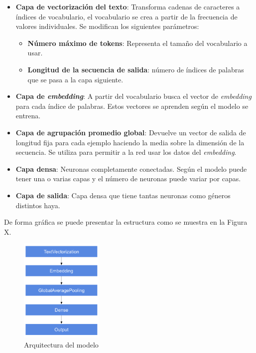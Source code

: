 \documentclass[12pt,a4paper, xcolor=table]{article}
\begin{document}
\begin{itemize}
\item \textbf{Capa de vectorización del texto}: Transforma cadenas de caracteres a índices de vocabulario, el vocabulario se crea a partir de la frecuencia de valores individuales. Se modifican los siguientes parámetros:
\begin{itemize}
\item \textbf{Número máximo de tokens}: Representa el tamaño del vocabulario a usar.
\item \textbf{Longitud de la secuencia de salida}: número de índices de palabras que se pasa a la capa siguiente.
\end{itemize}

\item \textbf{Capa de \textit{embedding}}: A partir del vocabulario busca el vector de \textit{embedding} para cada índice de palabras. Estos vectores se aprenden según el modelo se entrena.

\item \textbf{Capa de agrupación promedio global}: Devuelve un vector de salida de longitud fija para cada ejemplo haciendo la media sobre la dimensión de la secuencia. Se utiliza para permitir a la red usar los datos del \textit{embedding}.

\item \textbf{Capa densa}: Neuronas completamente conectadas. Según el modelo puede tener una o varias capas y el número de neuronas puede variar por capas.

\item \textbf{Capa de salida}: Capa densa que tiene tantas neuronas como géneros distintos haya.

\end{itemize}

De forma gráfica se puede presentar la estructura como se muestra en la Figura X.

  \begin{figure}[!h]
    \centering
    \includegraphics[width=150px]{img/Arquitectura.png}
    \caption{Arquitectura del modelo}
    \end{figure}
\end{document}

